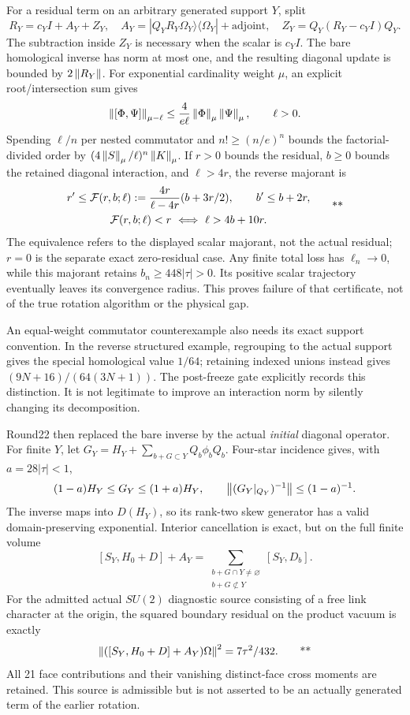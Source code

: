 For a residual term on an arbitrary generated support \(Y\), split
\[
 R_Y=c_YI+A_Y+Z_Y,\quad
 A_Y=|Q_YR_Y\Omega_Y\rangle\langle\Omega_Y|+\mathrm{adjoint},
 \quad Z_Y=Q_Y(R_Y-c_YI)Q_Y .
\]
The subtraction inside \(Z_Y\) is necessary when the scalar is \(c_YI\).
The bare homological inverse has norm at most one, and the resulting
diagonal update is bounded by \(2\left\lVert R_Y\right\rVert\).
For exponential cardinality weight \(\mu\), an explicit root/intersection
sum gives
\[
 \left\lVert [\Phi,\Psi]\right\rVert_{\mu-\ell}
 \le\frac4{e\ell}\left\lVert \Phi\right\rVert_\mu\left\lVert \Psi\right\rVert_\mu,\qquad \ell>0.
\]
Spending \(\ell/n\) per nested commutator and
\(n!\ge(n/e)^n\) bounds the factorial-divided order by
\((4\left\lVert S\right\rVert_\mu/\ell)^n\left\lVert K\right\rVert_\mu\).
If \(r>0\) bounds the residual, \(b\ge0\) bounds the retained diagonal
interaction, and \(\ell>4r\), the reverse majorant is
\begin{equation}
 \begin{gathered}
 r'\le\mathcal F(r,b;\ell):=
       \frac{4r}{\ell-4r}(b+3r/2),\qquad b'\le b+2r,\\
 \mathcal F(r,b;\ell)<r\ \Longleftrightarrow\ \ell>4b+10r .
 \end{gathered}
 \qquad\text{**}
 \label{eq:middle-recurrence}
\end{equation}
The equivalence refers to the displayed scalar majorant, not the actual
residual; \(r=0\) is the separate exact zero-residual case. Any finite
total loss has \(\ell_n\to0\), while this majorant
retains \(b_n\ge448|\tau|>0\). Its positive scalar trajectory eventually
leaves its convergence radius. This proves failure of that certificate,
not of the true rotation algorithm or the physical gap.

An equal-weight commutator counterexample also needs its exact support
convention. In the reverse structured example, regrouping to the actual
support gives the special homological value \(1/64\); retaining indexed
unions instead gives \((9N+16)/(64(3N+1))\).
The post-freeze gate explicitly records this distinction. It is not
legitimate to improve an interaction norm by silently changing its
decomposition.

Round22 then replaced the bare inverse by the actual \emph{initial}
diagonal operator. For finite \(Y\), let
\(G_Y=H_Y+\sum_{b+G\subset Y}Q_b\phi_bQ_b\).
Four-star incidence gives, with \(a=28|\tau|<1\),
\[
 (1-a)H_Y\le G_Y\le(1+a)H_Y,\qquad
 \left\lVert (G_Y|_{Q_Y})^{-1}\right\rVert\le(1-a)^{-1}.
\]
The inverse maps into \(D(H_Y)\), so its rank-two skew generator has a
valid domain-preserving exponential. Interior cancellation is exact,
but on the full finite volume
\[
 [S_Y,H_0+D]+A_Y
 =\sum_{\substack{b+G\cap Y\ne\varnothing\\b+G\not\subset Y}}
                          [S_Y,D_b].
\]
For the admitted actual \(SU(2)\) diagnostic source consisting of a free
link character at the origin, the squared boundary residual on the
product vacuum is exactly
\begin{equation}
 \left\lVert ([S_Y,H_0+D]+A_Y)\Omega\right\rVert^2=7\tau^2/432.
 \qquad\text{**}
 \label{eq:middle-boundary}
\end{equation}
All 21 face contributions and their vanishing distinct-face cross
moments are retained. This source is admissible but is not asserted to
be an actually generated term of the earlier rotation.

